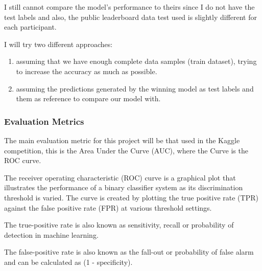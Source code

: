 \documentclass[]{article}
\begin{document}
I still cannot compare the model's performance to theirs since I do not have the test labels and also, the public leaderboard data test used is slightly different for each participant.

I will try two different approaches:
\begin{enumerate}
	\item assuming that we have enough complete data samples (train dataset), trying to increase the accuracy as much as possible. 
	\item assuming the predictions generated by the winning model as test labels and them as reference to compare our model with. 
\end{enumerate}

\subsubsection{Evaluation Metrics}\label{evaluation-metrics}

The main evaluation metric for this project will be that used in the Kaggle competition, this is the Area Under the Curve (AUC), where the Curve is the ROC curve.

The receiver operating characteristic (ROC) curve is a graphical plot that illustrates the performance of a binary classifier system as its discrimination threshold is varied. The curve is created by plotting the true positive rate (TPR) against the false positive rate (FPR) at various threshold settings.

The true-positive rate is also known as sensitivity, recall or probability of detection in machine learning.

The false-positive rate is also known as the fall-out or probability of false alarm and can be calculated as (1 - specificity). 
\end{document}
